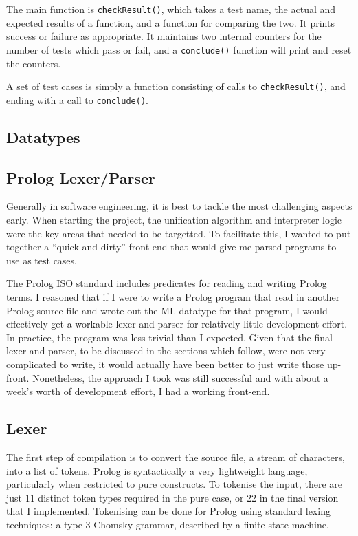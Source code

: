 \documentclass[12pt]{article}
\begin{document}
The main function is \verb|checkResult()|, which takes a test name, the actual and expected results of a function, and a function for comparing the two. It prints success or failure as appropriate. It maintains two internal counters for the number of tests which pass or fail, and a \verb|conclude()| function will print and reset the counters.

A set of test cases is simply a function consisting of calls to \verb|checkResult()|, and ending with a call to \verb|conclude()|.

\subsection{Datatypes}



\subsection{Prolog Lexer/Parser}

Generally in software engineering, it is best to tackle the most challenging aspects early. When starting the project, the unification algorithm and interpreter logic were the key areas that needed to be targetted. To facilitate this, I wanted to put together a ``quick and dirty'' front-end that would give me parsed programs to use as test cases.

The Prolog ISO standard includes predicates for reading and writing Prolog terms. I reasoned that if I were to write a Prolog program that read in another Prolog source file and wrote out the ML datatype for that program, I would effectively get a workable lexer and parser for relatively little development effort. In practice, the program was less trivial than I expected. Given that the final lexer and parser, to be discussed in the sections which follow, were not very complicated to write, it would actually have been better to just write those up-front. Nonetheless, the approach I took was still successful and with about a week's worth of development effort, I had a working front-end.

\subsection{Lexer}

The first step of compilation is to convert the source file, a stream of characters, into a list of tokens. Prolog is syntactically a very lightweight language, particularly when restricted to pure constructs. To tokenise the input, there are just 11 distinct token types required in the pure case, or 22 in the final version that I implemented. Tokenising can be done for Prolog using standard lexing techniques: a type-3 Chomsky grammar, described by a finite state machine. 
\end{document}
